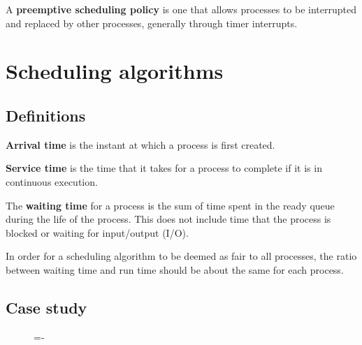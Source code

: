 \documentclass[a4paper]{systems-software}
\begin{document}
A \textbf{preemptive scheduling policy} is one that allows processes to be interrupted and replaced by other processes, generally through timer interrupts.


\section*{Scheduling algorithms}

\subsection*{Definitions}

\textbf{Arrival time} is the instant at which a process is first created.

\textbf{Service time} is the time that it takes for a process to complete if it is in continuous execution.

The \textbf{waiting time} for a process is the sum of time spent in the ready queue during the life of the process. This does not include time that the process is blocked or waiting for input/output (I/O).

In order for a scheduling algorithm to be deemed as fair to all processes, the ratio between waiting time and run time should be about the same for each process.


\subsection*{Case study}

\begin{figure}[H]
  \lineskip=-\fboxrule
\end{figure}
\end{document}
